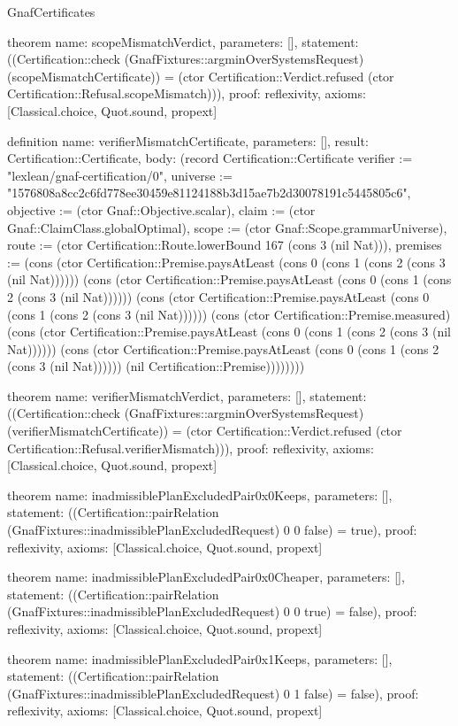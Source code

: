 \begin{lexlean}{GnafCertificates}
\begin{semanticmodule}
theorem{
  name: scopeMismatchVerdict,
  parameters: [],
  statement: ((Certification::check (GnafFixtures::argminOverSystemsRequest) (scopeMismatchCertificate)) = (ctor Certification::Verdict.refused (ctor Certification::Refusal.scopeMismatch))),
  proof: reflexivity{},
  axioms: [Classical.choice, Quot.sound, propext]
}

definition{
  name: verifierMismatchCertificate,
  parameters: [],
  result: Certification::Certificate,
  body: (record Certification::Certificate {verifier := "lexlean/gnaf-certification/0", universe := "1576808a8cc2c6fd778ee30459e81124188b3d15ae7b2d30078191c5445805c6", objective := (ctor Gnaf::Objective.scalar), claim := (ctor Gnaf::ClaimClass.globalOptimal), scope := (ctor Gnaf::Scope.grammarUniverse), route := (ctor Certification::Route.lowerBound 167 (cons 3 (nil Nat))), premises := (cons (ctor Certification::Premise.paysAtLeast (cons 0 (cons 1 (cons 2 (cons 3 (nil Nat)))))) (cons (ctor Certification::Premise.paysAtLeast (cons 0 (cons 1 (cons 2 (cons 3 (nil Nat)))))) (cons (ctor Certification::Premise.paysAtLeast (cons 0 (cons 1 (cons 2 (cons 3 (nil Nat)))))) (cons (ctor Certification::Premise.measured) (cons (ctor Certification::Premise.paysAtLeast (cons 0 (cons 1 (cons 2 (cons 3 (nil Nat)))))) (cons (ctor Certification::Premise.paysAtLeast (cons 0 (cons 1 (cons 2 (cons 3 (nil Nat)))))) (nil Certification::Premise)))))))})
}

theorem{
  name: verifierMismatchVerdict,
  parameters: [],
  statement: ((Certification::check (GnafFixtures::argminOverSystemsRequest) (verifierMismatchCertificate)) = (ctor Certification::Verdict.refused (ctor Certification::Refusal.verifierMismatch))),
  proof: reflexivity{},
  axioms: [Classical.choice, Quot.sound, propext]
}

theorem{
  name: inadmissiblePlanExcludedPair0x0Keeps,
  parameters: [],
  statement: ((Certification::pairRelation (GnafFixtures::inadmissiblePlanExcludedRequest) 0 0 false) = true),
  proof: reflexivity{},
  axioms: [Classical.choice, Quot.sound, propext]
}

theorem{
  name: inadmissiblePlanExcludedPair0x0Cheaper,
  parameters: [],
  statement: ((Certification::pairRelation (GnafFixtures::inadmissiblePlanExcludedRequest) 0 0 true) = false),
  proof: reflexivity{},
  axioms: [Classical.choice, Quot.sound, propext]
}

theorem{
  name: inadmissiblePlanExcludedPair0x1Keeps,
  parameters: [],
  statement: ((Certification::pairRelation (GnafFixtures::inadmissiblePlanExcludedRequest) 0 1 false) = false),
  proof: reflexivity{},
  axioms: [Classical.choice, Quot.sound, propext]
}


\end{semanticmodule}
\end{lexlean}
